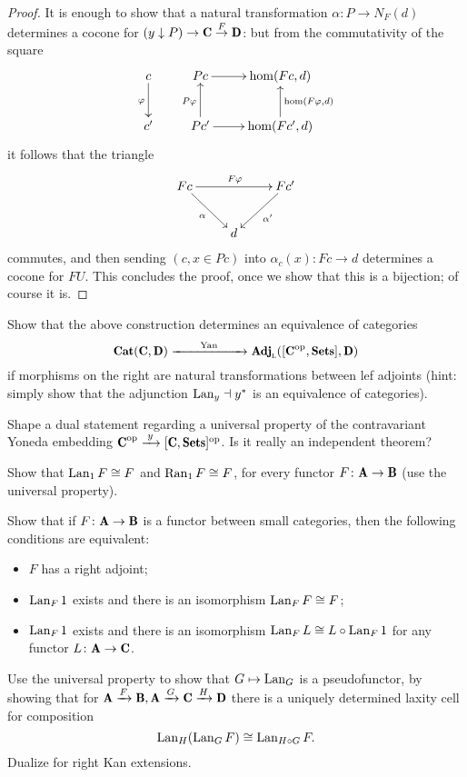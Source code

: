 \documentclass[a4paper,12pt]{amsart}
\begin{document}
\begin{proof}
It is enough to show that a natural transformation $\alpha\colon P \to N_F(d)$ determines a cocone for $(y\downarrow P) \to \C \overset{F}\to \D$: but from the commutativity of the square
\[
\xymatrix{
	c \ar[d]_\varphi&  Pc \ar[r]& \hom(Fc,d)\\
	c' & Pc' \ar[u]^{P\varphi}\ar[r]& \hom(Fc',d)\ar[u]_{\hom(F\varphi,d)}
}
\]
it follows that the triangle
\[
\xymatrix{
	Fc \ar[rr]^{F\varphi}\ar[dr]_\alpha&& Fc'\ar[dl]^{\alpha'} \\
	&d&
}
\]
commutes, and then sending $(c, x\in Pc)$ into $\alpha_c(x) \colon Fc \to d$ determines a cocone for $FU$. This concludes the proof, once we show that this is a bijection; of course it is.
\end{proof}
\begin{exercise}
Show that the above construction determines an equivalence of categories 
\[
\Cat(\C,\D)\xto{\qquad\text{Yan}\qquad} \cate{Adj}_\textsc{l}([\C^\opp,\Sets],\D)
\]
if morphisms on the right are natural transformations between lef adjoints (hint: simply show that the adjunction $\operatorname{Lan}_y\dashv y^*$ is an equivalence of categories).
\end{exercise}
\begin{exercise}
Shape a dual statement regarding a universal property of the contravariant Yoneda embedding $\C^\opp\xto{\;y\;}[\C, \Sets]^\opp$. Is it really an independent theorem?
\end{exercise}
\begin{exercise}
Show that $\operatorname{Lan}_1F\cong F$ and $\operatorname{Ran}_1F\cong F$, for every functor $F\colon \A\to \B$ (use the universal property).
\end{exercise}
\begin{exercise}
Show that if $F\colon \A\to\B$ is a functor between small categories, then the following conditions are equivalent:
\begin{itemize}
	\item $F$ has a right adjoint;
	\item $\operatorname{Lan}_F1$ exists and there is an isomorphism $\operatorname{Lan}_FF\cong F$;
	\item $\operatorname{Lan}_F1$ exists and there is an isomorphism $\operatorname{Lan}_FL\cong L\circ \operatorname{Lan}_F1$ for any functor $L\colon \A\to \C$.
\end{itemize}
\end{exercise}
\begin{exercise}
Use the universal property to show that $G\mapsto \operatorname{Lan}_G$ is a pseudofunctor, by showing that for $\A\xto{F}\B, \A\xto{G}\C\xto{H}\D$ there is a uniquely determined laxity cell for composition
\[
\operatorname{Lan}_H(\operatorname{Lan}_GF)\cong \operatorname{Lan}_{H\circ G}F.
\]
Dualize for right Kan extensions.
\end{exercise}
\end{document}
